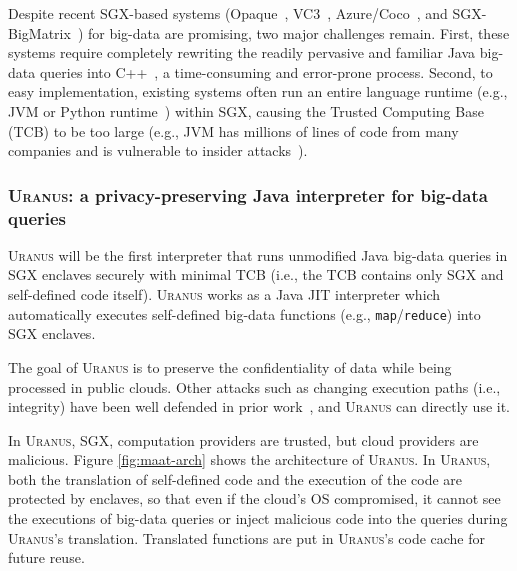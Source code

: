 \documentclass{article}
\let\vv\texttt
\newcommand{\maat}[0]{\textsc{Uranus}\xspace}
\newcommand{\eg}{{e.g.}}
\newcommand{\ie}{{i.e.}}
\begin{document}
Despite recent SGX-based systems (Opaque~\cite{opaque:nsdi17}, 
VC3~\cite{vc3:sp15}, Azure/Coco~\cite{azure:coco}, and 
SGX-BigMatrix~\cite{bigmatrix:ccs17}) for big-data are promising, two major 
challenges remain. First, these systems require completely rewriting the 
readily pervasive and familiar Java big-data queries 
into C++~\cite{opaque:nsdi17,vc3:sp15,azure:coco}, a time-consuming and 
error-prone process. Second, to easy implementation, existing systems often 
run an entire language runtime (\eg, JVM or Python 
runtime~\cite{bigmatrix:ccs17}) within SGX, causing the Trusted Computing Base 
(TCB) to be too large (\eg, JVM has millions of lines of code 
from many companies and is vulnerable to insider attacks~\cite{top-threats}).

\vspace{-.15in}
\subsubsection{\maat: a privacy-preserving Java interpreter 
for big-data queries} 
\label{sec:ift-problem}\vspace{-.075in}

\maat will be the first interpreter that runs unmodified Java big-data
queries in SGX enclaves securely with minimal TCB (\ie, the TCB contains only
SGX and self-defined code itself). \maat works as a Java JIT interpreter which
automatically executes self-defined big-data functions (\eg,
\vv{map}/\vv{reduce}) into SGX enclaves. 

The goal of \maat is to preserve the confidentiality of data while being 
processed in public clouds. Other attacks such as changing execution paths 
(\ie, integrity) have been well defended in prior work~\cite{jitguard:ccs17}, 
and \maat can directly use it.

In \maat, SGX,
computation providers are trusted, but cloud providers are malicious. Figure 
\ref{fig:maat-arch} shows the architecture of \maat. In \maat, both the 
translation of self-defined code and the execution of the code are protected by 
enclaves, so that even if the cloud's OS compromised, it cannot see the 
executions of big-data queries or inject malicious code into the queries during 
\maat's translation. Translated functions are put in \maat's code cache for 
future reuse.
\end{document}
